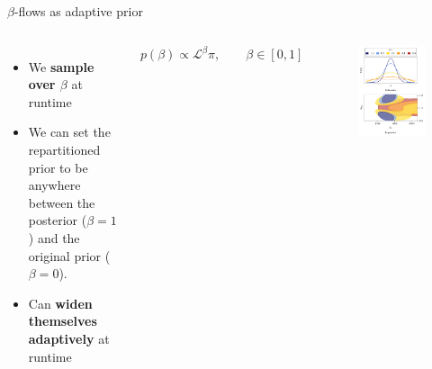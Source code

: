 \documentclass[aspectratio=169, 11pt]{beamer}
\begin{document}
\begin{frame}{$\beta$-flows as adaptive prior}
\begin{columns}
    \begin{itemize}
        \item We \textbf{sample over $\beta$} at runtime
        \item We can set the repartitioned prior to be anywhere between the posterior ($\beta=1$) and the original prior ($\beta=0$).
        \item Can \textbf{widen themselves adaptively} at runtime
    \end{itemize}\vspace{2em}
    \begin{equation}
        p(\beta) \propto \mathcal{L}^\beta \pi, \hspace{2em} \beta \in [0,1]
    \end{equation}
\begin{figure}
    \centering
    \includegraphics[width=1\textwidth]{Ca_Foscari Beamer/figure3_beta_v2.pdf}
\end{figure}
\end{columns}   
\end{frame}
\end{document}
